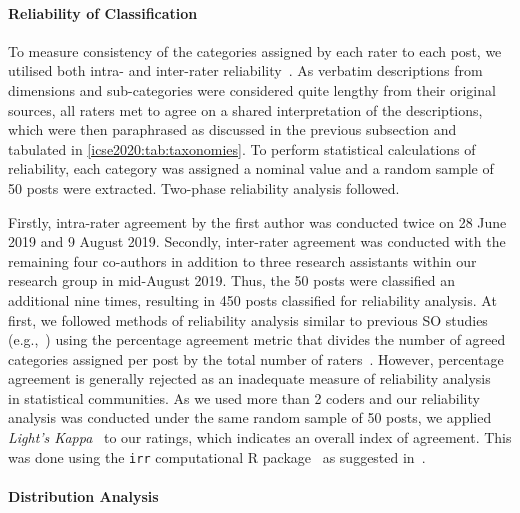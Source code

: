 \paragraph{Reliability of Classification}
\label{icse2020:ssec:method:filtering:reliability}

To measure consistency of the categories assigned by each rater to each post, we utilised both intra- and inter-rater reliability~\citep{McHugh:2012up}. As verbatim descriptions from dimensions and sub-categories were considered quite lengthy from their original sources, all raters met to agree on a shared interpretation of the descriptions, which were then paraphrased as discussed in the previous subsection and tabulated in \cref{icse2020:tab:taxonomies}. To perform statistical calculations of reliability, each category was assigned a nominal value and a random sample of 50 posts were extracted. Two-phase reliability analysis followed. 

Firstly, intra-rater agreement by the first author was conducted twice on 28 June 2019 and 9 August 2019. Secondly, inter-rater agreement was conducted with the remaining four co-authors in addition to three research assistants within our research group in mid-August 2019. Thus, the 50 posts were classified an additional nine times, resulting in 450 posts classified for reliability analysis. At first, we followed methods of reliability analysis similar to previous SO studies (e.g.,~\citep{Tahir:2018ks}) using the percentage agreement metric that divides the number of agreed categories assigned per post by the total number of raters~\citep{McHugh:2012up}. However, percentage agreement is generally rejected as an inadequate measure of reliability analysis~\citep{Cohen:1960tf,Krippendorff:2018tda,Hallgren:2012kt} in statistical communities. As we used more than 2 coders and our reliability analysis was conducted under the same random sample of 50 posts, we applied \textit{Light's Kappa}~\citep{Light:1971vz} to our ratings, which indicates an overall index of agreement. This was done using the \texttt{irr} computational R package~\citep{Gamer:tj} as suggested in~\citep{Hallgren:2012kt}.

\paragraph{Distribution Analysis}


